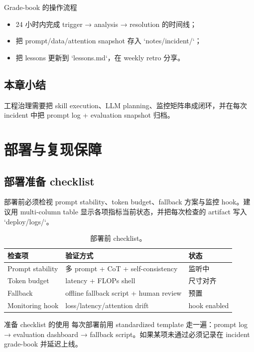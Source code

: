 \documentclass[a4paper]{article}
\begin{document}
\begin{importantbox}{Grade-book 的操作流程}
\begin{itemize}
    \item 24 小时内完成 trigger → analysis → resolution 的时间线；
    \item 把 prompt/data/attention snapshot 存入 `notes/incident/`；
    \item 把 lessons 更新到 `lessons.md`，在 weekly retro 分享。
\end{itemize}
\end{importantbox}

\subsection{本章小结}

工程治理需要把 skill execution、LLM planning、监控矩阵串成闭环，并在每次 incident 中把 prompt log + evaluation snapshot 归档。

\section{部署与复现保障}

\subsection{部署准备 checklist}

部署前必须检视 prompt stability、token budget、fallback 方案与监控 hook。建议用 multi-column table 显示各项指标当前状态，并把每次检查的 artifact 写入 `deploy/logs/`。

\begin{table}[H]
\centering
\begin{tabular}{p{4cm}p{5cm}p{3cm}}
\toprule
检查项 & 验证方式 & 状态 \\
\midrule
Prompt stability & 多 prompt + CoT + self-consistency & 监听中 \\
Token budget & latency + FLOPs shell & 尺寸对齐 \\
Fallback & offline fallback script + human review & 预置 \\
Monitoring hook & loss/latency/attention drift & hook enabled \\
\bottomrule
\end{tabular}
\caption{部署前 checklist。}
\end{table}

\begin{importantbox}{准备 checklist 的使用}
每次部署前用 standardized template 走一遍：prompt log → evaluation dashboard → fallback script。如果某项未通过必须记录在 incident grade-book 并延迟上线。
\end{importantbox}
\end{document}
